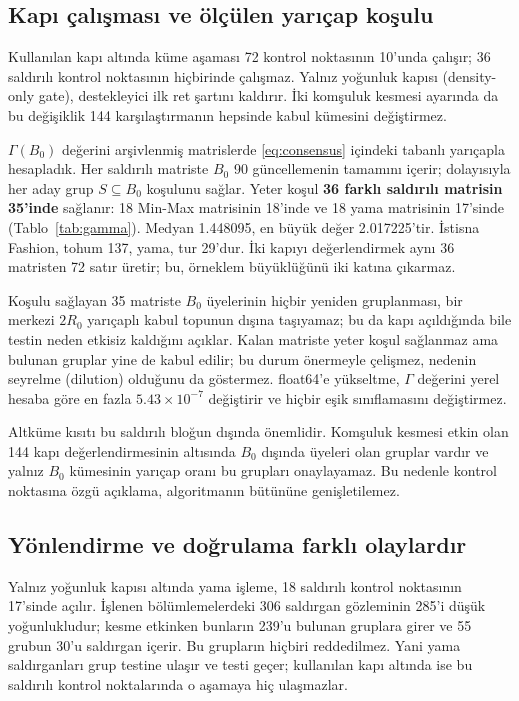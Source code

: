 \documentclass[journal]{IEEEtran}
\begin{document}
\subsection{Kapı çalışması ve ölçülen yarıçap koşulu}
Kullanılan kapı altında küme aşaması 72 kontrol noktasının 10'unda çalışır; 36 saldırılı kontrol noktasının hiçbirinde çalışmaz. Yalnız yoğunluk kapısı (density-only gate), destekleyici ilk ret şartını kaldırır. İki komşuluk kesmesi ayarında da bu değişiklik 144 karşılaştırmanın hepsinde kabul kümesini değiştirmez.


$\Gamma(B_0)$ değerini arşivlenmiş matrislerde \eqref{eq:consensus} içindeki tabanlı yarıçapla hesapladık. Her saldırılı matriste $B_0$ 90 güncellemenin tamamını içerir; dolayısıyla her aday grup $S\subseteq B_0$ koşulunu sağlar. Yeter koşul \textbf{36 farklı saldırılı matrisin 35'inde} sağlanır: 18 Min-Max matrisinin 18'inde ve 18 yama matrisinin 17'sinde (Tablo~\ref{tab:gamma}). Medyan 1.448095, en büyük değer 2.017225'tir. İstisna Fashion, tohum 137, yama, tur 29'dur. İki kapıyı değerlendirmek aynı 36 matristen 72 satır üretir; bu, örneklem büyüklüğünü iki katına çıkarmaz.

Koşulu sağlayan 35 matriste $B_0$ üyelerinin hiçbir yeniden gruplanması, bir merkezi $2R_0$ yarıçaplı kabul topunun dışına taşıyamaz; bu da kapı açıldığında bile testin neden etkisiz kaldığını açıklar. Kalan matriste yeter koşul sağlanmaz ama bulunan gruplar yine de kabul edilir; bu durum önermeyle çelişmez, nedenin seyrelme (dilution) olduğunu da göstermez. float64'e yükseltme, $\Gamma$ değerini yerel hesaba göre en fazla $5.43\times10^{-7}$ değiştirir ve hiçbir eşik sınıflamasını değiştirmez.

Altküme kısıtı bu saldırılı bloğun dışında önemlidir. Komşuluk kesmesi etkin olan 144 kapı değerlendirmesinin altısında $B_0$ dışında üyeleri olan gruplar vardır ve yalnız $B_0$ kümesinin yarıçap oranı bu grupları onaylayamaz. Bu nedenle kontrol noktasına özgü açıklama, algoritmanın bütününe genişletilemez.

\subsection{Yönlendirme ve doğrulama farklı olaylardır}
Yalnız yoğunluk kapısı altında yama işleme, 18 saldırılı kontrol noktasının 17'sinde açılır. İşlenen bölümlemelerdeki 306 saldırgan gözleminin 285'i düşük yoğunlukludur; kesme etkinken bunların 239'u bulunan gruplara girer ve 55 grubun 30'u saldırgan içerir. Bu grupların hiçbiri reddedilmez. Yani yama saldırganları grup testine ulaşır ve testi geçer; kullanılan kapı altında ise bu saldırılı kontrol noktalarında o aşamaya hiç ulaşmazlar.
\end{document}
